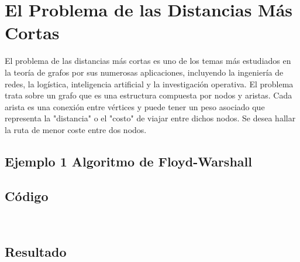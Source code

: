 \section{El Problema de las Distancias Más Cortas}
El problema de las distancias más cortas es uno de los temas más estudiados en la teoría de grafos por sus numerosas aplicaciones, incluyendo la ingeniería de redes, la logística, inteligencia artificial y la investigación operativa. El problema trata sobre un grafo que es una estructura compuesta por nodos y aristas. Cada arista es una conexión entre vértices y puede tener un peso asociado que representa la "distancia" o el "costo" de viajar entre dichos nodos. Se desea hallar la ruta de menor coste entre dos nodos.

\subsection{Ejemplo 1 Algoritmo de Floyd-Warshall}

\subsection{Código}
\
\subsection{Resultado}
